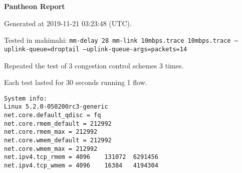 \documentclass{article}
\begin{document}
\centerline{\textbf{\large{Pantheon Report}}}
\vspace{20pt}

Generated at 2019-11-21 03:23:48 (UTC).

Tested in mahimahi: \texttt{mm-delay 28 mm-link 10mbps.trace 10mbps.trace --uplink-queue=droptail --uplink-queue-args=packets=14}

Repeated the test of 3 congestion control schemes 3 times.

Each test lasted for 30 seconds running 1 flow.

\begin{verbatim}
System info:
Linux 5.2.0-050200rc3-generic
net.core.default_qdisc = fq
net.core.rmem_default = 212992
net.core.rmem_max = 212992
net.core.wmem_default = 212992
net.core.wmem_max = 212992
net.ipv4.tcp_rmem = 4096	131072	6291456
net.ipv4.tcp_wmem = 4096	16384	4194304
\end{verbatim}
\end{document}
